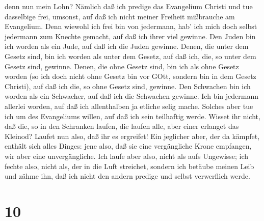 denn nun mein Lohn? Nämlich daß ich predige das Evangelium Christi und
tue dasselbige frei, umsonst, auf daß ich nicht meiner Freiheit
mißbrauche am Evangelium.  Denn wiewohl ich frei bin von
jedermann, hab' ich mich doch selbst jedermann zum Knechte gemacht, auf
daß ich ihrer viel gewinne.  Den Juden bin ich worden als
ein Jude, auf daß ich die Juden gewinne. Denen, die unter dem Gesetz
sind, bin ich worden als unter dem Gesetz, auf daß ich, die, so unter
dem Gesetz sind, gewinne.  Denen, die ohne Gesetz sind, bin
ich als ohne Gesetz worden (so ich doch nicht ohne Gesetz bin vor GOtt,
sondern bin in dem Gesetz Christi), auf daß ich die, so ohne Gesetz
sind, gewinne.  Den Schwachen bin ich worden als ein
Schwacher, auf daß ich die Schwachen gewinne. Ich bin jedermann allerlei
worden, auf daß ich allenthalben ja etliche selig mache. 
Solches aber tue ich um des Evangeliums willen, auf daß ich sein
teilhaftig werde.  Wisset ihr nicht, daß die, so in den
Schranken laufen, die laufen alle, aber einer erlanget das Kleinod?
Laufet nun also, daß ihr es ergreifet!  Ein jeglicher aber,
der da kämpfet, enthält sich alles Dinges: jene also, daß sie eine
vergängliche Krone empfangen, wir aber eine unvergängliche.
 Ich laufe aber also, nicht als aufs Ungewisse; ich fechte
also, nicht als, der in die Luft streichet,  sondern ich
betäube meinen Leib und zähme ihn, daß ich nicht den andern predige und
selbst verwerflich werde.

\hypertarget{section-9}{%
\section{10}\label{section-9}}

